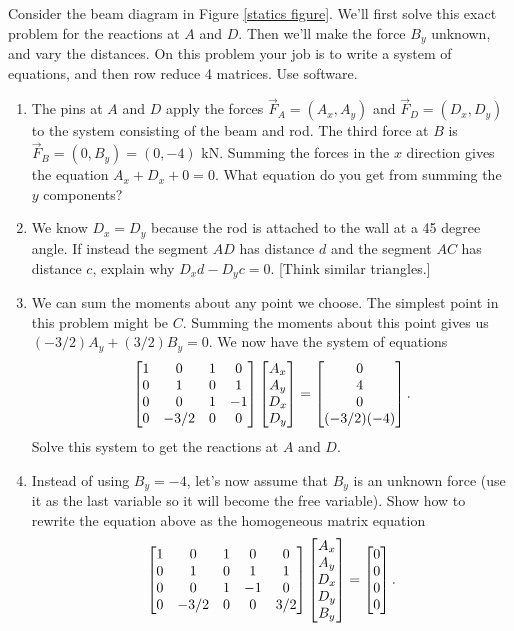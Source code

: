 \begin{problem}[Statics]
 Consider the beam diagram in Figure \ref{statics figure}. We'll first solve this exact problem for the reactions at $A$ and $D$.  Then we'll make the force $B_y$ unknown, and vary the distances. On this problem your job is to write a system of equations, and then row reduce 4 matrices. Use software. 
\begin{enumerate}
 \item The pins at $A$ and $D$ apply the forces $\vec F_A=(A_x,A_y)$ and $\vec F_D=(D_x,D_y)$ to the system consisting of the beam and rod.  The third force at $B$ is $\vec F_B=(0,B_y)=(0,-4)$ kN. Summing the forces in the $x$ direction gives the equation $A_x+D_x+0=0$. What equation do you get from summing the $y$ components? 
 \item We know $D_x=D_y$ because the rod is attached to the wall at a 45 degree angle. If instead the segment $AD$ has distance $d$ and the segment $AC$ has distance $c$, explain why $D_xd-D_yc=0$. [Think similar triangles.]  
 \item We can sum the moments about any point we choose.  The simplest point in this problem might be $C$. Summing the moments about this point gives us  $(-3/2) A_y+(3/2)B_y=0$. We now have the system of equations
$$\begin{bmatrix} 
1&0&1&0\\
0&1&0&1\\
0&0&1&-1\\
0&-3/2&0&0
 \end{bmatrix}
\begin{bmatrix} A_x\\A_y\\D_x\\D_y \end{bmatrix}
=\begin{bmatrix} 0\\4\\0\\(-3/2)(-4) \end{bmatrix}.$$
Solve this system to get the reactions at $A$ and $D$. 
 \item Instead of using $B_y=-4$, let's now assume that $B_y$ is an unknown force (use it as the last variable so it will become the free variable). Show how to rewrite the equation above as the homogeneous matrix equation
$$\begin{bmatrix} 
1&0&1&0&0\\
0&1&0&1&1\\
0&0&1&-1&0\\
0&-3/2&0&0&3/2
 \end{bmatrix}
\begin{bmatrix} A_x\\A_y\\D_x\\D_y\\B_y \end{bmatrix}
=\begin{bmatrix} 0\\0\\0\\0 \end{bmatrix}.$$

\end{enumerate}
\end{problem}

